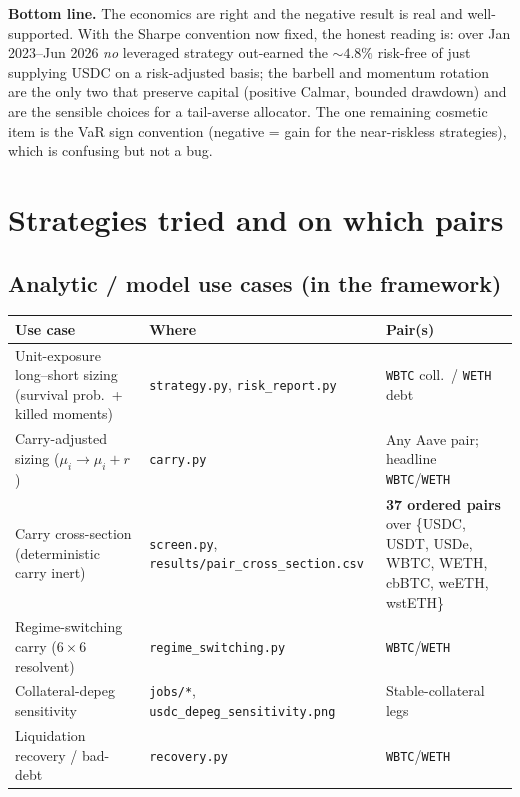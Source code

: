 \documentclass[11pt]{article}
\newcommand{\code}[1]{\texttt{\small #1}}
\begin{document}
\noindent\textbf{Bottom line.} The economics are right and the negative result
is real and well-supported. With the Sharpe convention now fixed, the honest
reading is: over Jan 2023--Jun 2026 \emph{no} leveraged strategy out-earned the
$\sim$$4.8\%$ risk-free of just supplying USDC on a risk-adjusted basis; the
barbell and momentum rotation are the only two that preserve capital (positive
Calmar, bounded drawdown) and are the sensible choices for a tail-averse
allocator. The one remaining cosmetic item is the VaR sign convention (negative
= gain for the near-riskless strategies), which is confusing but not a bug.

\section{Strategies tried and on which pairs}

\subsection*{Analytic / model use cases (in the framework)}
\begin{longtable}{p{4.2cm}p{4.4cm}p{4.6cm}}
\toprule
\textbf{Use case} & \textbf{Where} & \textbf{Pair(s)} \\
\midrule
\endhead
Unit-exposure long--short sizing (survival prob.\ + killed moments) &
\code{strategy.py}, \code{risk\_report.py} &
\code{WBTC} coll.\ / \code{WETH} debt \\
Carry-adjusted sizing ($\mu_i \to \mu_i + r$) &
\code{carry.py} &
Any Aave pair; headline \code{WBTC}/\code{WETH} \\
Carry cross-section (deterministic carry inert) &
\code{screen.py}, \code{results/pair\_cross\_section.csv} &
\textbf{37 ordered pairs} over \{USDC, USDT, USDe, WBTC, WETH, cbBTC, weETH, wstETH\} \\
Regime-switching carry ($6\times6$ resolvent) &
\code{regime\_switching.py} &
\code{WBTC}/\code{WETH} \\
Collateral-depeg sensitivity &
\code{jobs/*}, \code{usdc\_depeg\_sensitivity.png} &
Stable-collateral legs \\
Liquidation recovery / bad-debt &
\code{recovery.py} &
\code{WBTC}/\code{WETH} \\
\bottomrule
\end{longtable}
\end{document}
